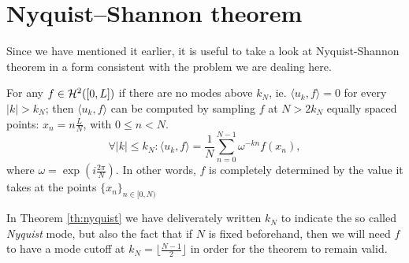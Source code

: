 \section{Nyquist--Shannon theorem}

\noindent Since we have mentioned it earlier,
it is useful to take a look at Nyquist-Shannon theorem
in a form consistent with the problem we are dealing here.

\begin{theorem}
    For any $f\in\mathcal{H}^2([0,L])$ if there are no modes above $k_N$,
    ie. $\langle u_k , f \rangle = 0$ for every $|k|>k_N$;
    then $\langle u_k,f\rangle$ can be computed
    by sampling $f$ at $N>2k_N$ equally spaced points:
    $x_n = n \frac{L}{N}$, with $0\le n < N$.
    \begin{equation}
        \forall |k|\le k_N\colon
        \langle u_k,f\rangle
        = \frac{1}{N} \sum_{n=0}^{N-1} \omega^{-kn} f(x_n),
        \label{eq:nyquist}
    \end{equation}
    where $\omega = \exp(i \frac{2\pi}{N})$.
    In other words, $f$ is completely determined
    by the value it takes at the points $\{ x_n \}_{n\in[0,N)}$
    \label{th:nyquist}
\end{theorem}
In Theorem \ref{th:nyquist} we have deliverately written
$k_N$ to indicate the so called \emph{Nyquist} mode,
but also the fact that if $N$ is fixed beforehand,
then we will need $f$ to have a mode cutoff at 
$k_N = \lfloor \frac{N-1}{2} \rfloor$ in order for the theorem to remain valid.

